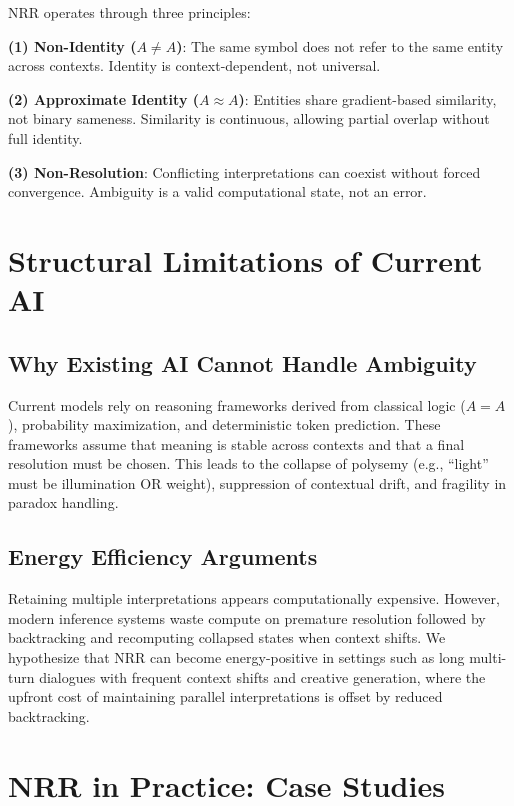 \documentclass[11pt,a4paper]{article}
\begin{document}
NRR operates through three principles:

\textbf{(1) Non-Identity ($A \neq A$)}: The same symbol does not refer to the same entity across contexts.
Identity is context-dependent, not universal.

\textbf{(2) Approximate Identity ($A \approx A$)}: Entities share gradient-based similarity, not binary sameness.
Similarity is continuous, allowing partial overlap without full identity.

\textbf{(3) Non-Resolution}: Conflicting interpretations can coexist without forced convergence.
Ambiguity is a valid computational state, not an error.

\section{Structural Limitations of Current AI}

\subsection{Why Existing AI Cannot Handle Ambiguity}

Current models rely on reasoning frameworks derived from classical logic ($A = A$), probability maximization, and deterministic token prediction.
These frameworks assume that meaning is stable across contexts and that a final resolution must be chosen.
This leads to the collapse of polysemy (e.g., ``light'' must be illumination OR weight), suppression of contextual drift, and fragility in paradox handling.

\subsection{Energy Efficiency Arguments}

Retaining multiple interpretations appears computationally expensive.
However, modern inference systems waste compute on premature resolution followed by backtracking and recomputing collapsed states when context shifts.
We hypothesize that NRR can become energy-positive in settings such as long multi-turn dialogues with frequent context shifts and creative generation, where the upfront cost of maintaining parallel interpretations is offset by reduced backtracking.

\section{NRR in Practice: Case Studies}
\end{document}

